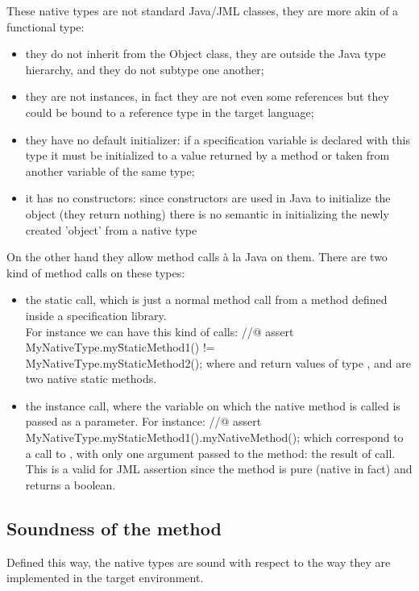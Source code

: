 These native types are not standard Java/JML classes, they are more akin of a functional type:
\begin{itemize}
\item they do not inherit from the Object class, 
they are outside the Java type hierarchy, and they do not
subtype one another;
\item they are not instances, in fact they are not even some references but 
they could be bound to a reference type in the target language;
\item they have no default initializer: 
if a specification variable is declared with this type it must
be initialized to a value returned by a method or taken from 
another variable of the same type;
\item it has no constructors: since constructors are used in Java to 
initialize the object (they return nothing) there is no semantic in 
initializing the newly created 'object' from a native type
\end{itemize}
On the other hand they allow method calls \`a la Java on them. 
There are two kind of method calls on these types:
\begin {itemize}
\item the static call, which is just a normal method call from a 
method defined inside a specification library.\\
For instance we can have this kind of calls:
\btab
//@ assert MyNativeType.my\=StaticMethod1() !=\\ \>MyNativeType.myStaticMethod2();
\etab
where  and   return  values of type , 
and are two native static methods.
\item the instance call, where the variable on which the native method is called is passed as a 
parameter. For instance:
\btab
//@ assert MyNativeType.myStaticMethod1().myNativeMethod();
\etab
which correspond to a call to , with only one argument passed to the method: the
result of  call. This is a valid for JML assertion since the method 
 is
pure (native in fact) and returns a boolean.
\end{itemize}
\subsection{Soundness of the method}
Defined this way, the native types are sound with respect to the way they are implemented in the 
target environment. 

